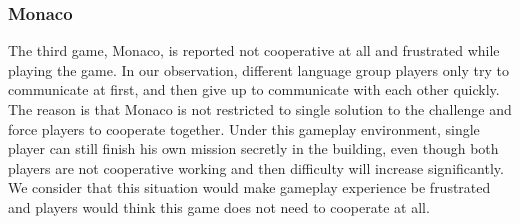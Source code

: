 \subsubsection{Monaco}

The third game, Monaco, is reported not cooperative at all and frustrated while playing the game. In our observation, different language group players only try to communicate at first, and then give up to communicate with each other quickly. The reason is that Monaco is not restricted to single solution to the challenge and force players to cooperate together. Under this gameplay environment, single player can still finish his own mission secretly in the building, even though both players are not cooperative working and then difficulty will increase significantly. We consider that this situation would make gameplay experience be frustrated and players would think this game does not need to cooperate at all.





